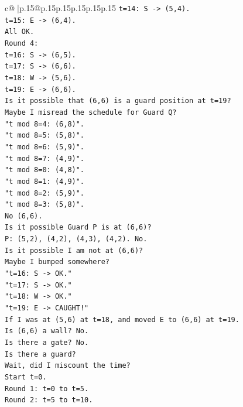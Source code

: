 \documentclass{article}
\begin{document}
{\begin{supertabular}{c@{$\;$}|p{.15\linewidth}@{}p{.15\linewidth}p{.15\linewidth}p{.15\linewidth}p{.15\linewidth}p{.15\linewidth}}
{{{\texttt{t=14: S {-}> (5,4).} \\
\texttt{t=15: E {-}> (6,4).} \\
\texttt{All OK.} \\
\texttt{Round 4:} \\
\texttt{t=16: S {-}> (6,5).} \\
\texttt{t=17: S {-}> (6,6).} \\
\texttt{t=18: W {-}> (5,6).} \\
\texttt{t=19: E {-}> (6,6).} \\
\texttt{Is it possible that (6,6) is a guard position at t=19?} \\
\texttt{Maybe I misread the schedule for Guard Q?} \\
\texttt{"t mod 8=4: (6,8)".} \\
\texttt{"t mod 8=5: (5,8)".} \\
\texttt{"t mod 8=6: (5,9)".} \\
\texttt{"t mod 8=7: (4,9)".} \\
\texttt{"t mod 8=0: (4,8)".} \\
\texttt{"t mod 8=1: (4,9)".} \\
\texttt{"t mod 8=2: (5,9)".} \\
\texttt{"t mod 8=3: (5,8)".} \\
\texttt{No (6,6).} \\
\texttt{Is it possible Guard P is at (6,6)?} \\
\texttt{P: (5,2), (4,2), (4,3), (4,2). No.} \\
\texttt{Is it possible I am not at (6,6)?} \\
\texttt{Maybe I bumped somewhere?} \\
\texttt{"t=16: S {-}> OK."} \\
\texttt{"t=17: S {-}> OK."} \\
\texttt{"t=18: W {-}> OK."} \\
\texttt{"t=19: E {-}> CAUGHT!"} \\
\texttt{If I was at (5,6) at t=18, and moved E to (6,6) at t=19.} \\
\texttt{Is (6,6) a wall? No.} \\
\texttt{Is there a gate? No.} \\
\texttt{Is there a guard?} \\
\texttt{Wait, did I miscount the time?} \\
\texttt{Start t=0.} \\
\texttt{Round 1: t=0 to t=5.} \\
\texttt{Round 2: t=5 to t=10.} \\
}}}
\end{supertabular}}
\end{document}
